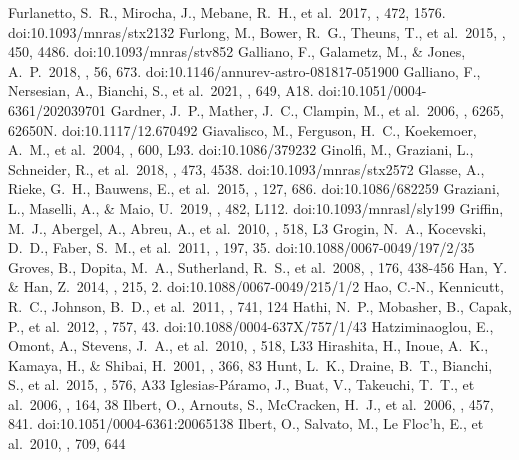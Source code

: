 \documentclass{aa}
\begin{document}
\begin{thebibliography}{}
  Furlanetto, S.~R., Mirocha, J., Mebane, R.~H., et al.\ 2017, \mnras, 472, 1576. doi:10.1093/mnras/stx2132
  Furlong, M., Bower, R.~G., Theuns, T., et al.\ 2015, \mnras, 450, 4486. doi:10.1093/mnras/stv852
  Galliano, F., Galametz, M., \& Jones, A.~P.\ 2018, \araa, 56, 673. doi:10.1146/annurev-astro-081817-051900
  Galliano, F., Nersesian, A., Bianchi, S., et al.\ 2021, \aap, 649, A18. doi:10.1051/0004-6361/202039701
  Gardner, J.~P., Mather, J.~C., Clampin, M., et al.\ 2006, \procspie, 6265, 62650N. doi:10.1117/12.670492
  Giavalisco, M., Ferguson, H.~C., Koekemoer, A.~M., et al.\ 2004, \apjl, 600, L93. doi:10.1086/379232
  Ginolfi, M., Graziani, L., Schneider, R., et al.\ 2018, \mnras, 473, 4538. doi:10.1093/mnras/stx2572
  Glasse, A., Rieke, G.~H., Bauwens, E., et al.\ 2015, \pasp, 127, 686. doi:10.1086/682259
  Graziani, L., Maselli, A., \& Maio, U.\ 2019, \mnras, 482, L112. doi:10.1093/mnrasl/sly199
  Griffin, M.~J., Abergel, A., Abreu, A., et al.\ 2010, \aap, 518, L3
  Grogin, N.~A., Kocevski, D.~D., Faber, S.~M., et al.\ 2011, \apjs, 197, 35. doi:10.1088/0067-0049/197/2/35
  Groves, B., Dopita, M.~A., Sutherland, R.~S., et al.\ 2008, \apjs, 176, 438-456
  Han, Y. \& Han, Z.\ 2014, \apjs, 215, 2. doi:10.1088/0067-0049/215/1/2
  Hao, C.-N., Kennicutt, R.~C., Johnson, B.~D., et al.\ 2011, \apj, 741, 124  
  Hathi, N.~P., Mobasher, B., Capak, P., et al.\ 2012, \apj, 757, 43. doi:10.1088/0004-637X/757/1/43
  Hatziminaoglou, E., Omont, A., Stevens, J.~A., et al.\ 2010, \aap, 518, L33
  Hirashita, H., Inoue, A.~K., Kamaya, H., \& Shibai, H.\ 2001, \aap, 366, 83
  Hunt, L.~K., Draine, B.~T., Bianchi, S., et al.\ 2015, \aap, 576, A33 
  Iglesias-P{\'a}ramo, J., Buat, V., Takeuchi, T.~T., et al.\ 2006, \apjs, 164, 38
  Ilbert, O., Arnouts, S., McCracken, H.~J., et al.\ 2006, \aap, 457, 841. doi:10.1051/0004-6361:20065138
  Ilbert, O., Salvato, M., Le Floc'h, E., et al.\ 2010, \apj, 709, 644

\end{thebibliography}
\end{document}
